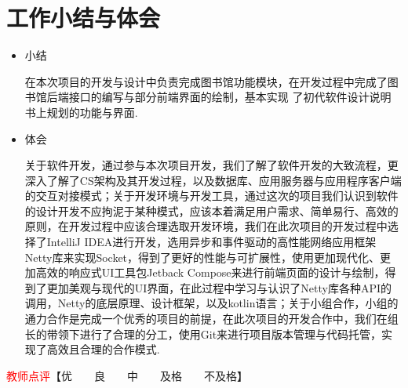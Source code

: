 \documentclass{article}
\begin{document}
\section{工作小结与体会}
\begin{itemize}
      \item 小结

            在本次项目的开发与设计中负责完成图书馆功能模块，在开发过程中完成了图书馆后端接口的编写与部分前端界面的绘制，基本实现 了初代软件设计说明书上规划的功能与界面.

      \item 体会

            关于软件开发，通过参与本次项目开发，我们了解了软件开发的大致流程，更深入了解了CS架构及其开发过程，以及数据库、应用服务器与应用程序客户端的交互对接模式；关于开发环境与开发工具，通过这次的项目我们认识到软件的设计开发不应拘泥于某种模式，应该本着满足用户需求、简单易行、高效的原则，在开发过程中应该合理选取开发环境，我们在此次项目的开发过程中选择了IntelliJ IDEA进行开发，选用异步和事件驱动的高性能网络应用框架Netty库来实现Socket，得到了更好的性能与可扩展性，使用更加现代化、更加高效的响应式UI工具包Jetback Compose来进行前端页面的设计与绘制，得到了更加美观与现代的UI界面，在此过程中学习与认识了Netty库各种API的调用，Netty的底层原理、设计框架，以及kotlin语言；关于小组合作，小组的通力合作是完成一个优秀的项目的前提，在此次项目的开发合作中，我们在组长的带领下进行了合理的分工，使用Git来进行项目版本管理与代码托管，实现了高效且合理的合作模式.

\end{itemize}

\vfill
\noindent\textcolor{red}{教师点评}【优~~~~良~~~~中~~~~及格~~~~不及格】
\end{document}
